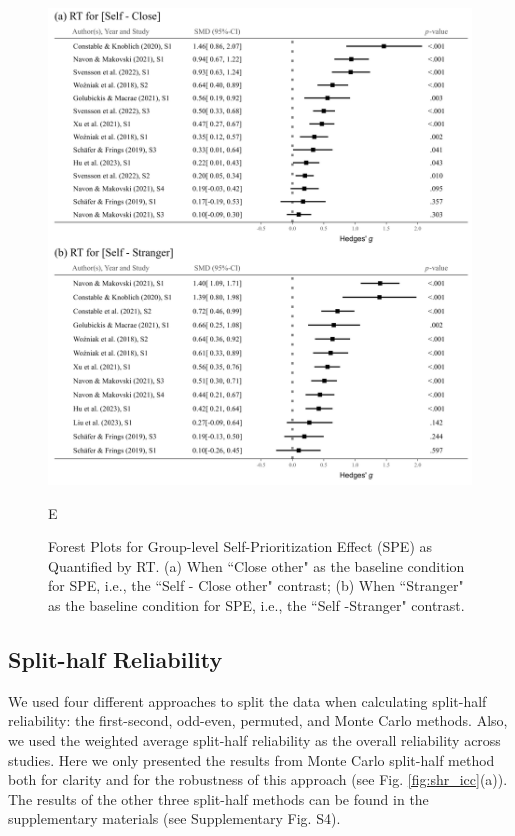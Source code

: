 \documentclass[sn-apa]{sn-jnl}%
\theoremstyle{thmstyleone}%
\theoremstyle{thmstyletwo}%
\theoremstyle{thmstylethree}%
\begin{document}
\begin{figure}[!hb]
	\centering
	\includegraphics[width=1\textwidth]{./Figure/Fig_3_Forest_RT.png}
	\caption{Forest Plots for Group-level Self-Prioritization Effect (SPE) as Quantified by RT. (a) When ``Close other" as the baseline condition for SPE, i.e., the ``Self - Close other" contrast; (b) When ``Stranger" as the baseline condition for SPE, i.e., the ``Self -Stranger" contrast.}
	\label{fig:meta_RT}E
\end{figure}
\clearpage

\subsection{Split-half Reliability}\label{subsec:split}

We used four different approaches to split the data when calculating split-half reliability: the first-second, odd-even, permuted, and Monte Carlo methods. Also, we used the weighted average split-half reliability as the overall reliability across studies. Here we only presented the results from Monte Carlo split-half method both for clarity and for the robustness of this approach \parencite{pronk2022methods} (see Fig. \ref{fig:shr_icc}(a)). The results of the other three split-half methods can be found in the supplementary materials (see Supplementary Fig. S4).
\end{document}
